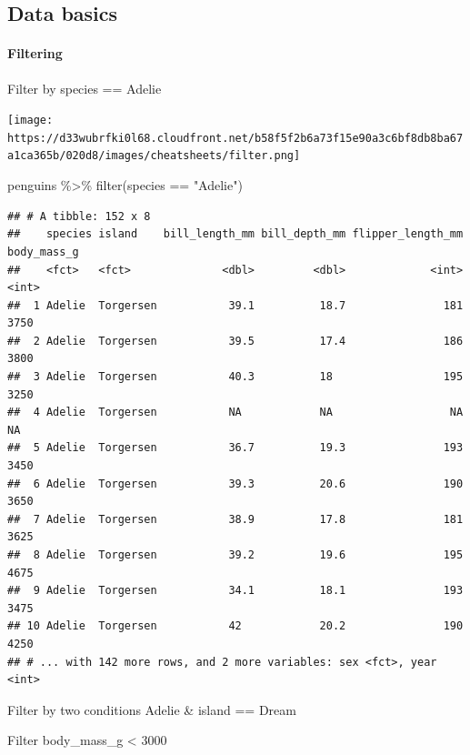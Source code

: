 \documentclass[
]{article}
\newenvironment{Shaded}{\begin{snugshade}}{\end{snugshade}}
\newcommand{\FunctionTok}[1]{\textcolor[rgb]{0.00,0.00,0.00}{#1}}
\newcommand{\NormalTok}[1]{#1}
\newcommand{\SpecialCharTok}[1]{\textcolor[rgb]{0.00,0.00,0.00}{#1}}
\newcommand{\StringTok}[1]{\textcolor[rgb]{0.31,0.60,0.02}{#1}}
\begin{document}
\hypertarget{data-basics}{%
\subsection{Data basics}\label{data-basics}}

\hypertarget{filtering}{%
\paragraph{Filtering}\label{filtering}}

Filter by species == Adelie

\texttt{[image: https://d33wubrfki0l68.cloudfront.net/b58f5f2b6a73f15e90a3c6bf8db8ba67a1ca365b/020d8/images/cheatsheets/filter.png]}

\begin{Shaded}
\begin{Highlighting}[]
\NormalTok{penguins }\SpecialCharTok{\%\textgreater{}\%} 
  \FunctionTok{filter}\NormalTok{(species }\SpecialCharTok{==} \StringTok{"Adelie"}\NormalTok{)}
\end{Highlighting}
\end{Shaded}

\begin{verbatim}
## # A tibble: 152 x 8
##    species island    bill_length_mm bill_depth_mm flipper_length_mm body_mass_g
##    <fct>   <fct>              <dbl>         <dbl>             <int>       <int>
##  1 Adelie  Torgersen           39.1          18.7               181        3750
##  2 Adelie  Torgersen           39.5          17.4               186        3800
##  3 Adelie  Torgersen           40.3          18                 195        3250
##  4 Adelie  Torgersen           NA            NA                  NA          NA
##  5 Adelie  Torgersen           36.7          19.3               193        3450
##  6 Adelie  Torgersen           39.3          20.6               190        3650
##  7 Adelie  Torgersen           38.9          17.8               181        3625
##  8 Adelie  Torgersen           39.2          19.6               195        4675
##  9 Adelie  Torgersen           34.1          18.1               193        3475
## 10 Adelie  Torgersen           42            20.2               190        4250
## # ... with 142 more rows, and 2 more variables: sex <fct>, year <int>
\end{verbatim}

Filter by two conditions Adelie \& island == Dream

Filter body\_mass\_g \textless{} 3000
\end{document}
